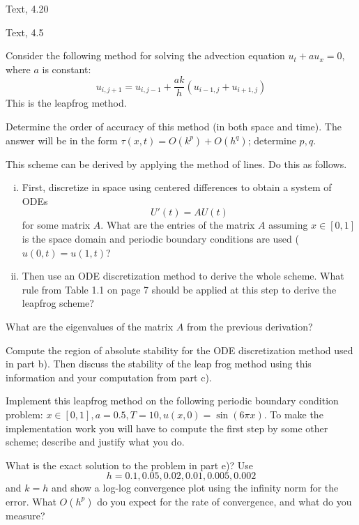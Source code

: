 \documentclass[minion]{homework}
\begin{document}
\begin{problems}

\problem  Text, 4.20

\problem Text, 4.5

\problem  Consider the following method for solving the advection equation 
$u_t + au_x = 0$, where $a$ is constant:
\[
u_{i,j+1} = u_{i,j-1} + \frac{ak}{h}(u_{i-1,j}+u_{i+1,j})
\]
This is the leapfrog method.

\begin{subproblems}
\item Determine the order of accuracy of this method (in both space and time). The answer will be in the form $\tau(x,t)= O(k^p) +O(h^q)$; determine $p,q$.

\item This scheme can be derived by applying the method of lines.  
Do this as follows.
\begin{enumerate}[i)] 
	\item First, discretize in space using centered differences
to obtain a system of ODEs
\[
U'(t) = A U(t)
\]
for some matrix $A$.  What are the entries of the matrix $A$
assuming $x\in[0,1]$ is the space domain and periodic
boundary conditions are used ($u(0,t)=u(1,t)$?
\item Then use an ODE discretization method to derive the
whole scheme.  What rule from Table 1.1 on page 7 should be
applied at this step to derive the leapfrog scheme?
\end{enumerate}
\item What are the eigenvalues of the matrix $A$ from the previous derivation? 

\item Compute the region of absolute stability for the ODE discretization
method used in part b).  Then discuss the stability of the leap frog method
using this information and your computation from part c).

\item Implement this leapfrog method on the following periodic boundary condition problem: $x \in [0, 1], a = 0.5, T = 10, u(x, 0) = \sin(6\pi x)$. 
To make the implementation work you will have to compute the first step by some other scheme; describe and justify what you do.

\item What is the exact solution to the problem in part e)? Use
\[
h = 0.1, 0.05, 0.02, 0.01, 0.005, 0.002
\]
and $k = h$ and show a log-log convergence plot using the infinity norm for the error. What $O(h^p)$ do you expect for the rate of convergence, and what do you measure?
\end{subproblems}


\end{problems}
\end{document}
